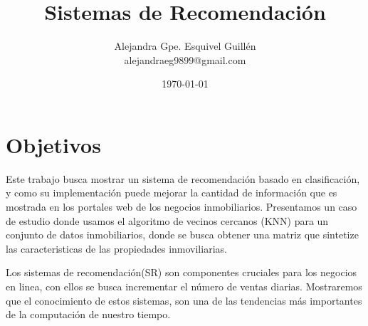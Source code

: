 \documentclass[a4paper]{article}
\date{\today}
\author{Alejandra Gpe. Esquivel Guillén \\ alejandraeg9899@gmail.com}
\title{Sistemas de Recomendación}
\begin{document}
\maketitle

\section{Objetivos}
Este trabajo busca mostrar un sistema de recomendación basado en clasificación, y como su implementación puede mejorar la cantidad de información que es mostrada  en los portales web de los negocios inmobiliarios. 
Presentamos un caso de estudio donde usamos el algoritmo de vecinos cercanos (KNN) para un conjunto de datos inmobiliarios, donde se busca obtener una matriz que sintetize las caracteristicas de las propiedades inmoviliarias. 

Los sistemas de recomendación(SR) son componentes cruciales para los negocios en linea, con ellos se busca incrementar el número de ventas diarias. Mostraremos que el conocimiento de estos sistemas, son una de las tendencias más importantes de la computación de nuestro tiempo.










\end{document}
